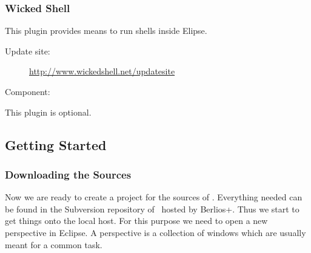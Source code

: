 \subsubsection{Wicked Shell}
This plugin provides means to run shells inside Elipse.
\begin{description}
\item [Update site:] \url{http://www.wickedshell.net/updatesite}
\item [Component:] 
\end{description}
This plugin is optional.
%


\subsection{Getting Started}

\subsubsection{Downloading the Sources}

Now we are ready to create a project for the sources of \ExTeX.
Everything needed can be found in the Subversion repository of \ExTeX\ 
hosted by \+Berlios+. Thus we start to get things onto the local host.
For this purpose we need to open a new perspective in Eclipse. A
perspective is a collection of windows which are usually meant for a
common task.

